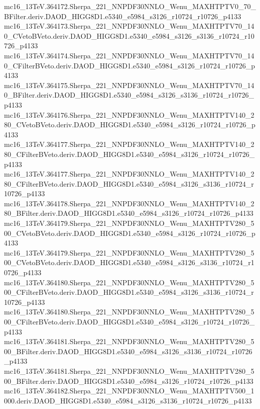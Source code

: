 mc16_13TeV.364172.Sherpa_221_NNPDF30NNLO_Wenu_MAXHTPTV0_70_BFilter.deriv.DAOD_HIGG8D1.e5340_e5984_s3126_r10724_r10726_p4133 \\
mc16_13TeV.364173.Sherpa_221_NNPDF30NNLO_Wenu_MAXHTPTV70_140_CVetoBVeto.deriv.DAOD_HIGG8D1.e5340_e5984_s3126_s3136_r10724_r10726_p4133 \\
mc16_13TeV.364174.Sherpa_221_NNPDF30NNLO_Wenu_MAXHTPTV70_140_CFilterBVeto.deriv.DAOD_HIGG8D1.e5340_e5984_s3126_r10724_r10726_p4133 \\
mc16_13TeV.364175.Sherpa_221_NNPDF30NNLO_Wenu_MAXHTPTV70_140_BFilter.deriv.DAOD_HIGG8D1.e5340_e5984_s3126_s3136_r10724_r10726_p4133 \\
mc16_13TeV.364176.Sherpa_221_NNPDF30NNLO_Wenu_MAXHTPTV140_280_CVetoBVeto.deriv.DAOD_HIGG8D1.e5340_e5984_s3126_r10724_r10726_p4133 \\
mc16_13TeV.364177.Sherpa_221_NNPDF30NNLO_Wenu_MAXHTPTV140_280_CFilterBVeto.deriv.DAOD_HIGG8D1.e5340_e5984_s3126_r10724_r10726_p4133 \\
mc16_13TeV.364177.Sherpa_221_NNPDF30NNLO_Wenu_MAXHTPTV140_280_CFilterBVeto.deriv.DAOD_HIGG8D1.e5340_e5984_s3126_s3136_r10724_r10726_p4133 \\
mc16_13TeV.364178.Sherpa_221_NNPDF30NNLO_Wenu_MAXHTPTV140_280_BFilter.deriv.DAOD_HIGG8D1.e5340_e5984_s3126_r10724_r10726_p4133 \\
mc16_13TeV.364179.Sherpa_221_NNPDF30NNLO_Wenu_MAXHTPTV280_500_CVetoBVeto.deriv.DAOD_HIGG8D1.e5340_e5984_s3126_r10724_r10726_p4133 \\
mc16_13TeV.364179.Sherpa_221_NNPDF30NNLO_Wenu_MAXHTPTV280_500_CVetoBVeto.deriv.DAOD_HIGG8D1.e5340_e5984_s3126_s3136_r10724_r10726_p4133 \\
mc16_13TeV.364180.Sherpa_221_NNPDF30NNLO_Wenu_MAXHTPTV280_500_CFilterBVeto.deriv.DAOD_HIGG8D1.e5340_e5984_s3126_s3136_r10724_r10726_p4133 \\
mc16_13TeV.364180.Sherpa_221_NNPDF30NNLO_Wenu_MAXHTPTV280_500_CFilterBVeto.deriv.DAOD_HIGG8D1.e5340_e5984_s3126_r10724_r10726_p4133 \\
mc16_13TeV.364181.Sherpa_221_NNPDF30NNLO_Wenu_MAXHTPTV280_500_BFilter.deriv.DAOD_HIGG8D1.e5340_e5984_s3126_s3136_r10724_r10726_p4133 \\
mc16_13TeV.364181.Sherpa_221_NNPDF30NNLO_Wenu_MAXHTPTV280_500_BFilter.deriv.DAOD_HIGG8D1.e5340_e5984_s3126_r10724_r10726_p4133 \\
mc16_13TeV.364182.Sherpa_221_NNPDF30NNLO_Wenu_MAXHTPTV500_1000.deriv.DAOD_HIGG8D1.e5340_e5984_s3126_s3136_r10724_r10726_p4133 \\
